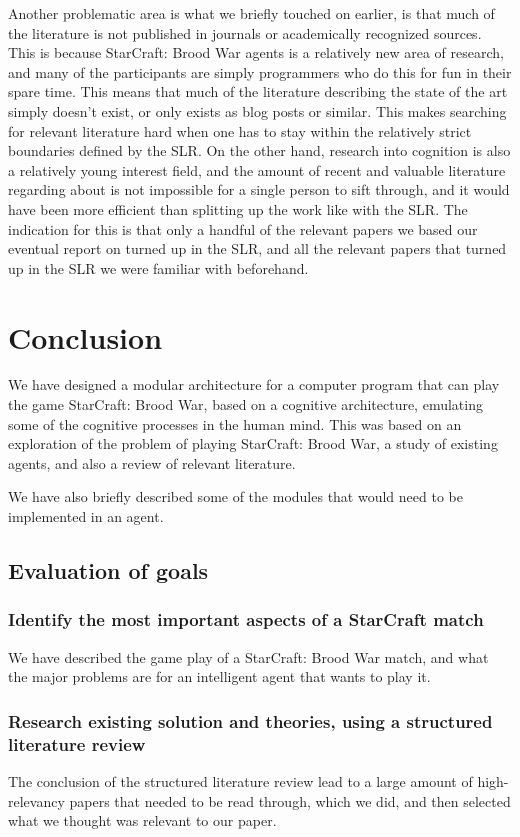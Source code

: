 Another problematic area is what we briefly touched on earlier, is that much of
the literature is not published in journals or academically recognized sources.
This is because StarCraft: Brood War agents is a relatively new area of
research, and many of the participants are simply programmers who do this for
fun in their spare time. This means that much of the literature describing the
state of the art simply doesn't exist, or only exists as blog posts or similar.
This makes searching for relevant literature hard when one has to stay within
the relatively strict boundaries defined by the SLR. On the other hand,
research into cognition is also a relatively young interest field, and the
amount of recent and valuable literature regarding about is not impossible for a
single person to sift through, and it would have been more efficient than
splitting up the work like with the SLR. The indication for this is that only a
handful of the relevant papers we based our eventual report on turned up in the
SLR, and all the relevant papers that turned up in the SLR we were familiar
with beforehand.

\section{Conclusion}
We have designed a modular architecture for a computer program that can play the
game StarCraft: Brood War, based on a cognitive architecture, emulating some of
the cognitive processes in the human mind. This was based on an exploration of
the problem of playing StarCraft: Brood War, a study of existing agents, and
also a review of relevant literature.

We have also briefly described some of the modules that would need to be
implemented in an agent.

\subsection{Evaluation of goals}
\subsubsection{Identify the most important aspects of a StarCraft match}
We have described the game play of a StarCraft: Brood War match, and what the
major problems are for an intelligent agent that wants to play it.
\subsubsection{Research existing solution and theories, using a structured
literature review}
The conclusion of the structured literature review lead to a large amount of
high-relevancy papers that needed to be read through, which we did, and then
selected what we thought was relevant to our paper.
